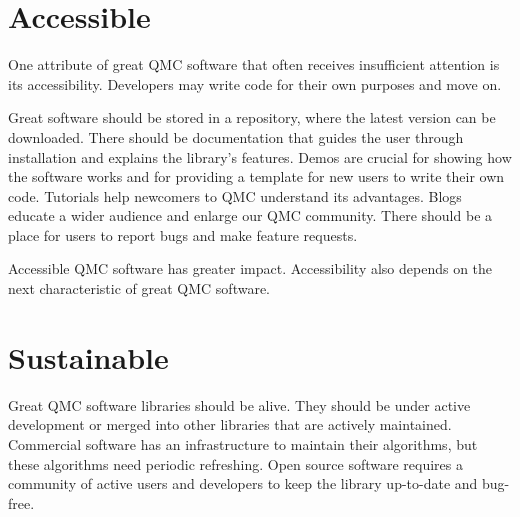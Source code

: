 \documentclass[graybox]{svmult}
\begin{document}
\section{Accessible} \label{CDHJS_sec:accessible}
One attribute of great QMC software that often receives insufficient attention is its accessibility.  Developers may write code for their own purposes and move on.

Great software should be stored in a repository, where the latest version can be downloaded.  There should be documentation that guides the user through installation and explains the library's features.  Demos are crucial for showing how the software works and for providing a template for new users to write their own code.  Tutorials help newcomers to QMC understand its advantages. Blogs educate a wider audience and enlarge our QMC community.  There should be a place for users to report bugs and make feature requests.

Accessible QMC software has greater impact.  Accessibility also depends on the next characteristic of great QMC software.


\section{Sustainable} \label{CDHJS_sec:sustainable}
Great QMC software libraries should be alive.  They should be under active development or merged into other libraries that are actively maintained.  Commercial software has an infrastructure to maintain their algorithms, but these algorithms need periodic refreshing. Open source software requires a community of active users and developers to keep the library up-to-date and bug-free.
\end{document}
